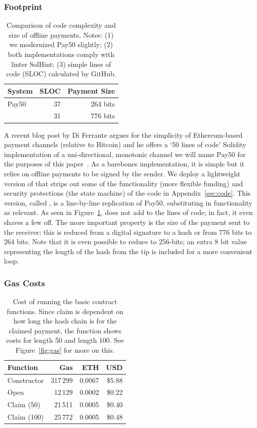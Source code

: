 \subsubsection{Footprint}

\begin{table}[t]          
\centering
\begin{tabular}{ l | r | r }
System 		& SLOC 	& Payment Size 	  \\ \hline
\textsf{Pay50} 	& 37  	& 264 bits  		  \\
\eww 		& 31		& 776 bits  		  \\ 
\end{tabular}
\caption{Comparison of code complexity and size of offline payments. Notes: (1) we modernized \textsf{Pay50} slightly; (2) both implementations comply with linter SolHint; (3) simple lines of code (SLOC) calculated by GitHub.\label{table:loc}}
\end{table}

A recent blog post by Di Ferrante argues for the simplicity of Ethereum-based payment channels (relative to Bitcoin) and he offers a `50 lines of code' Solidity implementation of a uni-directional, monotonic channel we will name \textsf{Pay50} for the purposes of this paper~\cite{DF17}. As a barebones implementation, it is simple but it relies on offline payments to be signed by the sender. We deploy a lightweight version of \ew that strips out some of the functionality (\eg more flexible funding) and security protections (\eg the state machine) of the code in Appendix~\ref{sec:code}. This version, called \eww, is a line-by-line replication of \textsf{Pay50}, substituting in \ew functionality as relevant. As seen in Figure~\ref{table:loc}, \eww does not add to the lines of code; in fact, it even shaves a few off. The more important property is the size of the payment sent to the receiver; this is reduced from a digital signature to a hash or from 776 bits to 264 bits. Note that it is even possible to reduce \eww to 256-bits; an extra 8 bit value representing the length of the hash from the tip is included for a more convenient loop.

\subsubsection{Gas Costs}

\begin{table}[t]          
\centering
\begin{tabular}{ l | r | r | r }
Function & Gas & ETH & USD \\ \hline
Constructor 		&317\,299  	& 0.0067 	& \$5.88 \\
Open 			&12\,129 		& 0.0002 	& \$0.22 \\ 
Claim (50) 		&21\,511  	& 0.0005 	& \$0.40 \\
Claim (100) 		&25\,772  	& 0.0005 	& \$0.48 \\ 
\end{tabular}
\caption{Cost of running the basic contract functions. Since claim is dependent on how long the hash chain is for the claimed payment, the function shows costs for length 50 and length 100. See Figure~\ref{fig:gas} for more on this.\label{table:gas}}
\end{table}

